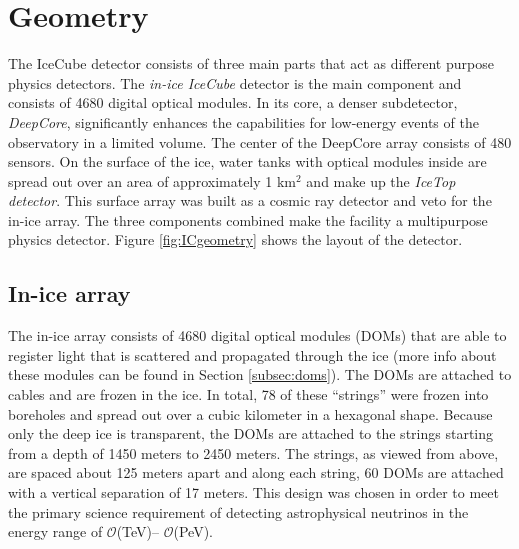 \section{Geometry}
The IceCube detector consists of three main parts that act as different purpose physics detectors. 
The \textit{in-ice IceCube} detector is the main component and consists of 4680 digital optical modules. In its core, a denser subdetector, \textit{DeepCore}, significantly enhances the capabilities for low-energy events of the observatory in a limited volume. The center of the DeepCore array consists of 480 sensors.
On the surface of the ice, water tanks with optical modules inside are spread out over an area of approximately 1 km$^2$ and make up the \textit{IceTop detector}. This surface array was built as a cosmic ray detector and veto for the in-ice array.  The three components combined make the facility a multipurpose physics detector. Figure \ref{fig:ICgeometry} shows the layout of the detector.

\subsection{In-ice array}
The in-ice array consists of 4680 digital optical modules (DOMs) that are able to register light that is scattered and propagated through the ice (more info about these modules can be found in Section \ref{subsec:doms}). The DOMs are attached to cables and are frozen in the ice. In total, 78 of these ``strings'' were frozen into boreholes and spread out over a cubic kilometer in a hexagonal shape. Because only the deep ice is transparent, the DOMs are attached to the strings starting from a depth of 1450 meters to 2450 meters. The strings, as viewed from above, are spaced about 125 meters apart and along each string, 60 DOMs are attached with a vertical separation of 17 meters. This design was chosen in order to meet the primary science requirement of detecting astrophysical neutrinos in the energy range of $\mathcal{O}$(TeV)– $\mathcal{O}$(PeV).

 
